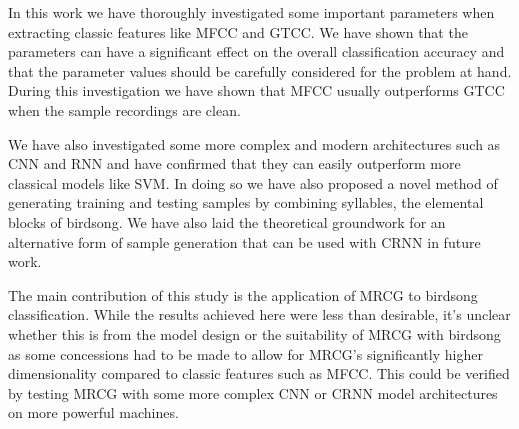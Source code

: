In this work we have thoroughly investigated some important parameters when
extracting classic features like MFCC and GTCC\@. We have shown that the
parameters can have a significant effect on the overall classification accuracy
and that the parameter values should be carefully considered for the problem at
hand. During this investigation we have shown that MFCC usually outperforms GTCC
when the sample recordings are clean.

We have also investigated some more complex and modern architectures such as CNN
and RNN and have confirmed that they can easily outperform more classical models
like SVM\@. In doing so we have also proposed a novel method of generating
training and testing samples by combining syllables, the elemental blocks of
birdsong. We have also laid the theoretical groundwork for an alternative form
of sample generation that can be used with CRNN in future work.

The main contribution of this study is the application of MRCG to birdsong
classification. While the results achieved here were less than desirable, it's
unclear whether this is from the model design or the suitability of MRCG with
birdsong as some concessions had to be made to allow for MRCG's significantly
higher dimensionality compared to classic features such as MFCC\@. This could be
verified by testing MRCG with some more complex CNN or CRNN model architectures
on more powerful machines.
